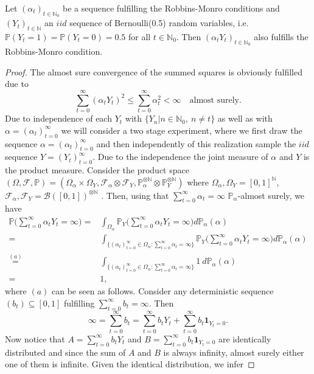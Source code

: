 \documentclass[10pt,a4paper]{amsart}
\newcommand{\N}{\mathbb{N}}
\newcommand{\cB}{\mathcal{B}}
\newcommand{\cF}{\mathcal{F}}
\begin{document}
\begin{lemma}\label{lem:RM}
    Let $(\alpha_t)_{t\in\N_0}$ be a sequence fulfilling the Robbins-Monro conditions and $(Y_t)_{t\in\N}$ an $iid$ sequence of Bernoulli(0.5) random variables, i.e. $\mathbb P(Y_t=1)=\mathbb P(Y_t=0)=0.5$ for all $t\in\N_0$.
    Then $(\alpha_tY_t)_{t\in\N_0}$ also fulfills the Robbins-Monro condition.
\end{lemma}

\begin{proof}
    The almost sure convergence of the summed squares is obviously fulfilled due to 
    \[\sum_{t=0}^\infty(\alpha_tY_t)^2\leq\sum_{t=0}^\infty \alpha_t^2<\infty\quad \text{almost surely.}\]
    Due to independence of each $Y_t$ with $\{Y_n|n\in\N_0,\ n\neq t\}$ as well as with $\alpha=(\alpha_t)_{t=0}^\infty$ we will consider a two stage experiment, where we first draw the sequence $\alpha=(\alpha_t)_{t=0}^\infty$ and then independently of this realization sample the $iid$ sequence $Y=(Y_t)_{t=0}^\infty$. Due to the independence the joint measure of $\alpha$ and $Y$ is the product measure. Consider the product space $(\Omega,\cF,\mathbb P)=(\Omega_\alpha\times\Omega_Y,\cF_\alpha\otimes\cF_Y,\mathbb P^{\otimes\N}_\alpha\otimes\mathbb P^{\otimes\N}_Y)$ where $\Omega_\alpha,\Omega_Y=[0,1]^\N$, $\cF_\alpha,\cF_Y=\cB([0,1])^{\otimes \N}$ . Then, using that $\sum_{t=0}^\infty\alpha_t=\infty$ $\mathbb P_\alpha$-almost surely, we have
    \begin{align*}   
    \mathbb P\Big(\sum_{t=0}^\infty\alpha_tY_t=\infty\Big)
    =&\int_{\Omega_\alpha}
    \mathbb P_Y\Big(\sum_{t=0}^\infty\alpha_tY_t=\infty\Big)
    d\mathbb P_\alpha(\alpha)\\
            =&\int_{\{(\alpha_t)_{t=0}^\infty\in \Omega_\alpha:\sum_{t=0}^\infty\alpha_t=\infty\}}\mathbb P_Y\Big(\sum_{t=0}^\infty\alpha_tY_t=\infty\Big)d\mathbb P_\alpha(\alpha)\\
            \overset{(a)}{=}&\int_{\{(\alpha_t)_{t=0}^\infty\in \Omega_\alpha:\sum_{t=0}^\infty\alpha_t=\infty\}}1\ d\mathbb P_\alpha(\alpha)\\
            =& 1,
    \end{align*} 
    where $(a)$ can be seen as follows. Consider any deterministic sequence $(b_t)\subseteq[0,1]$ fulfilling $\sum_{t=0}^\infty b_t=\infty$. Then
    \[\infty= \sum_{t=0}^\infty b_t=\sum_{t=0}^\infty b_tY_t+\sum_{t=0}^\infty b_t\textbf{1}_{Y_t=0}.\]
    Now notice that $A=\sum_{t=0}^\infty b_tY_t$ and $B=\sum_{t=0}^\infty b_t\textbf{1}_{Y_t=0}$ are identically distributed and since the sum of $A$ and $B$ is always infinity, almost surely either one of them is infinite. Given the identical distribution, we infer

\end{proof}
\end{document}
